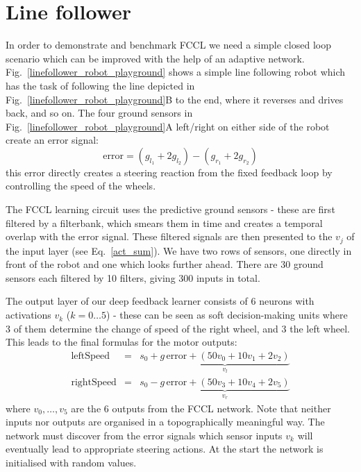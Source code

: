 \documentclass[Afour,sageh,times]{sagej}
\begin{document}
\section{Line follower}
In order to demonstrate and benchmark FCCL we need a simple closed loop scenario
which can be improved with the help of an adaptive network.
Fig.~\ref{linefollower_robot_playground} shows a simple line following
robot which has the task of following the line depicted in
Fig.~\ref{linefollower_robot_playground}B to the end, where it
reverses and drives back, and so on. The four ground sensors in
Fig.~\ref{linefollower_robot_playground}A left/right on either side
of the robot create an error signal:
\begin{equation}
\mathrm{error} = (g_{l_1}+2 g_{l_2})-(g_{r_1}+2 g_{r_2}) \label{line_error}
\end{equation}
this error directly creates a steering reaction from the fixed
feedback loop by controlling the speed of the wheels.

The FCCL learning circuit uses the predictive ground sensors - these
are first filtered by a filterbank, which smears them in time and
creates a temporal overlap with the error signal. These filtered
signals are then presented to the $v_j$ of the input layer (see
Eq.~\ref{act_sum}). We have two rows of sensors, one directly in front
of the robot and one which looks further ahead. There are 30 ground
sensors each filtered by 10 filters, giving 300 inputs in total.

The output layer of our deep feedback learner consists of 6 neurons
with activations $v_k$ ($k=0 \ldots 5$) - these can be seen as soft
decision-making units where 3 of them determine the change of speed of
the right wheel, and 3 the left wheel. This leads to the
final formulas for the motor outputs:
\begin{eqnarray}
  \mathrm{leftSpeed} &=& s_0 + \underbrace{g\, \mathrm{error} + \left( 50 v_0 + 10 v_1 + 2 v_2 \right)}_{v_l} \\
  \mathrm{rightSpeed} &=& s_0 - \underbrace{g\, \mathrm{error} + \left( 50 v_3 + 10 v_4 + 2 v_5 \right)}_{v_r}
\end{eqnarray}
where $v_0, \ldots, v_5$ are the 6 outputs from the FCCL network. Note
that neither inputs nor outputs are organised in a topographically
meaningful way. The network must discover from the error signals
which sensor inputs $v_k$ will eventually lead to appropriate steering
actions. At the start the network is initialised with random values.
\end{document}
